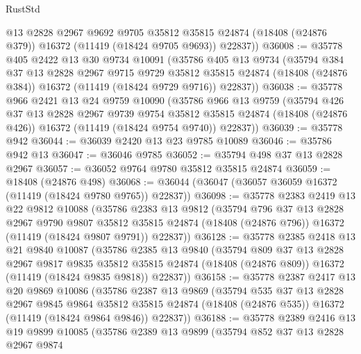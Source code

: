 \begin{lexlean}{RustStd}
\begin{coremodule}
        @13
        @2828
        @2967
        @9692
        @9705
        @35812
        @35815
        @24874
        (@18408 (@24876 @379))
        @16372
        (@11419 (@18424 @9705 @9693))
        @22837))
@36008 := @35778
    @405
    @2422
    @13
    @30
    @9734
    @10091
    (@35786
      @405
      @13
      @9734
      (@35794
        @384
        @37
        @13
        @2828
        @2967
        @9715
        @9729
        @35812
        @35815
        @24874
        (@18408 (@24876 @384))
        @16372
        (@11419 (@18424 @9729 @9716))
        @22837))
@36038 := @35778
    @966
    @2421
    @13
    @24
    @9759
    @10090
    (@35786
      @966
      @13
      @9759
      (@35794
        @426
        @37
        @13
        @2828
        @2967
        @9739
        @9754
        @35812
        @35815
        @24874
        (@18408 (@24876 @426))
        @16372
        (@11419 (@18424 @9754 @9740))
        @22837))
@36039 := @35778 @942
@36044 := @36039 @2420 @13 @23 @9785 @10089
@36046 := @35786 @942 @13
@36047 := @36046 @9785
@36052 := @35794 @498 @37 @13 @2828 @2967
@36057 := @36052 @9764 @9780 @35812 @35815 @24874
@36059 := @18408 (@24876 @498)
@36068 := @36044 (@36047 (@36057 @36059 @16372 (@11419 (@18424 @9780 @9765)) @22837))
@36098 := @35778
    @2383
    @2419
    @13
    @22
    @9812
    @10088
    (@35786
      @2383
      @13
      @9812
      (@35794
        @796
        @37
        @13
        @2828
        @2967
        @9790
        @9807
        @35812
        @35815
        @24874
        (@18408 (@24876 @796))
        @16372
        (@11419 (@18424 @9807 @9791))
        @22837))
@36128 := @35778
    @2385
    @2418
    @13
    @21
    @9840
    @10087
    (@35786
      @2385
      @13
      @9840
      (@35794
        @809
        @37
        @13
        @2828
        @2967
        @9817
        @9835
        @35812
        @35815
        @24874
        (@18408 (@24876 @809))
        @16372
        (@11419 (@18424 @9835 @9818))
        @22837))
@36158 := @35778
    @2387
    @2417
    @13
    @20
    @9869
    @10086
    (@35786
      @2387
      @13
      @9869
      (@35794
        @535
        @37
        @13
        @2828
        @2967
        @9845
        @9864
        @35812
        @35815
        @24874
        (@18408 (@24876 @535))
        @16372
        (@11419 (@18424 @9864 @9846))
        @22837))
@36188 := @35778
    @2389
    @2416
    @13
    @19
    @9899
    @10085
    (@35786
      @2389
      @13
      @9899
      (@35794
        @852
        @37
        @13
        @2828
        @2967
        @9874

\end{coremodule}
\end{lexlean}

